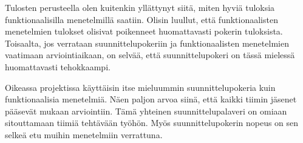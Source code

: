 \documentclass[a4paper]{article}
\begin{document}
Tulosten perusteella olen kuitenkin yllättynyt siitä, miten hyviä tuloksia funktionaalisilla menetelmillä saatiin. Olisin luullut, että funktionaalisten menetelmien tulokset olisivat poikenneet huomattavasti pokerin tuloksista. Toisaalta, jos verrataan suunnittelupokeriin ja funktionaalisten menetelmien vaatimaan arviointiaikaan, on selvää, että suunnittelupokeri on tässä mielessä huomattavasti tehokkaampi. 

Oikeassa projektissa käyttäisin itse mieluummin suunnittelupokeria kuin funktionaalisia menetelmiä. Näen paljon arvoa siinä, että kaikki tiimin jäsenet pääsevät mukaan arviointiin. Tämä yhteinen suunnittelupalaveri on omiaan sitouttamaan tiimiä tehtävään työhön. Myös suunnittelupokerin nopeus on sen selkeä etu muihin menetelmiin verrattuna.
\end{document}
